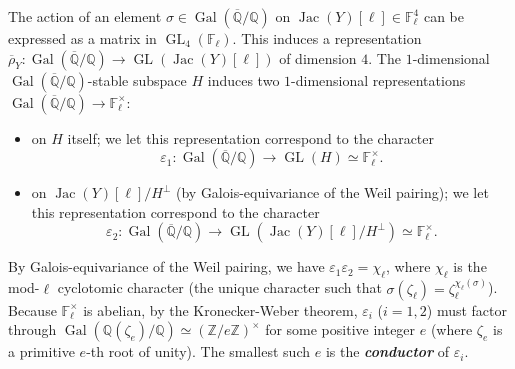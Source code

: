 \documentclass{amsproc}
\numberwithin{equation}{section}
\theoremstyle{definition}
\theoremstyle{remark}
\newcommand{\vocab}[1]{\textbf{\textit{\boldmath #1}}}
\DeclareMathOperator{\Jac}{Jac}
\DeclareMathOperator{\GL}{GL}
\DeclareMathOperator{\Gal}{Gal}
\newcommand{\eps}{\varepsilon}
\newcommand{\ZZ}{\mathbb Z}
\newcommand{\QQ}{\mathbb Q}
\newcommand{\FF}{\mathbb F}
\newcommand{\Qbar}{\overline{\QQ}}
\newcommand{\GalQ}{\Gal(\Qbar/\QQ)}
\begin{document}
The action of an element $\sigma\in\GalQ$ on $\Jac(Y)[\ell]\in\FF_\ell^4$ can be expressed as a matrix in $\GL_4(\FF_\ell)$. This induces a representation $\overline\rho_Y : \GalQ \to \GL(\Jac(Y)[\ell])$ of dimension $4$. 
The $1$-dimensional $\GalQ$-stable subspace $H$ induces two $1$-dimensional representations $\GalQ\to\FF_\ell^\times$:
\begin{itemize}
    \item on $H$ itself; we let this representation correspond to the character $$\eps_1 : \GalQ\to\GL(H) \simeq \FF_\ell^\times.$$
    \item on $\Jac(Y)[\ell] / H^\perp$ (by Galois-equivariance of the Weil pairing); we let this representation correspond to the character 
    $$\eps_2 : \GalQ \to \GL(\Jac(Y)[\ell]/H^\perp) \simeq \FF_\ell^\times.$$
\end{itemize}
By Galois-equivariance of the Weil pairing,
we have $\eps_1 \eps_2 = \chi_\ell$, where $\chi_\ell$ is the mod-$\ell$ cyclotomic character (the unique character such that $\sigma(\zeta_\ell) = \zeta_\ell^{\chi_\ell(\sigma)}$). 
Because $\FF_\ell^\times$ is abelian, by the Kronecker-Weber theorem, $\eps_i$ ($i=1,2$) must factor through $\Gal(\QQ(\zeta_e)/\QQ)\simeq (\ZZ/e\ZZ)^\times$ for some positive integer $e$ (where $\zeta_e$ is a primitive $e$-th root of unity). The smallest such $e$ is the \vocab{conductor} of $\eps_i$.
\end{document}
